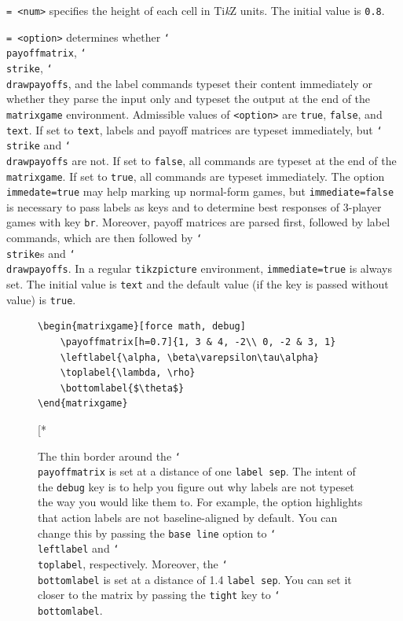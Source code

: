 \documentclass{article}
\makeatletter
\newcounter{fox}
\def\fox{\@ifstar\@fox\@@fox}
\def\@@fox{\@ifnextchar[{\fox@opt}{\fox@bgt}}
\newenvironment{desc}{\itemize[leftmargin=50pt]}{\enditemize}
\def\option#1#2{\item[\texttt{#1}] \hskip-1.5pt\texttt{#2}}
\renewcommand{\textbackslash}{\char`\\}
\def\cmd#1{\texttt{\color{cmd}\textbackslash#1}}
\def\TikZ{Ti\emph{k}Z\xspace}
\makeatother
\begin{document}
\begin{desc}
\option{h}{= <num>} specifies the height of each cell in \TikZ units. The initial value is \texttt{0.8}.

\option{immediate}{= <option>} determines whether \cmd{payoffmatrix}, \cmd{strike}, \cmd{drawpayoffs}, and the label commands typeset their content immediately or whether they parse the input only and typeset the output at the end of the \texttt{matrixgame} environment. Admissible values of \texttt{<option>} are \texttt{true}, \texttt{false}, and \texttt{text}. If set to \texttt{text}, labels and payoff matrices are typeset immediately, but \cmd{strike} and \cmd{drawpayoffs} are not. If set to \texttt{false}, all commands are typeset at the end of the \texttt{matrixgame}. If set to \texttt{true}, all commands are typeset immediately. The option \texttt{immedate=true} may help marking up normal-form games, but \texttt{immediate=false} is necessary to pass labels as keys and to determine best responses of 3-player games with key \texttt{br}. Moreover, payoff matrices are parsed first, followed by label commands, which are then followed by \cmd{strike}s and \cmd{drawpayoffs}. In a regular \texttt{tikzpicture} environment, \texttt{immediate=true} is always set. The initial value is \texttt{text} and the default value (if the key is passed without value) is \texttt{true}.

\begin{figure}
\begin{minipage}{0.6\textwidth}
\begin{verbatim}
\begin{matrixgame}[force math, debug]
	\payoffmatrix[h=0.7]{1, 3 & 4, -2\\ 0, -2 & 3, 1}
	\leftlabel{\alpha, \beta\varepsilon\tau\alpha}
	\toplabel{\lambda, \rho}
	\bottomlabel{$\theta$}
\end{matrixgame}
\end{verbatim}
\end{minipage}\hspace{0.01\textwidth}%
\begin{minipage}{0.3815\textwidth}
\fox*{\centering\vskip-2.5pt
\begin{matrixgame}
	\leftlabel{\alpha, \beta\varepsilon\tau\alpha}
	\toplabel{\lambda, \rho}
	\bottomlabel{$\theta$}
\end{matrixgame}\vspace*{-2.5pt}
}
\end{minipage}%
\caption{The thin border around the \cmd{payoffmatrix} is set at a distance of one \texttt{label sep}. The intent of the \texttt{debug} key is to help you figure out why labels are not typeset the way you would like them to. For example, the option highlights that action labels are not baseline-aligned by default. You can change this by passing the \texttt{base line} option to \cmd{leftlabel} and \cmd{toplabel}, respectively. Moreover, the \cmd{bottomlabel} is set at a distance of 1.4 \texttt{label sep}. You can set it closer to the matrix by passing the \texttt{tight} key to \cmd{bottomlabel}.}\label{matrix:debug}
\end{figure}


\end{desc}
\end{document}
